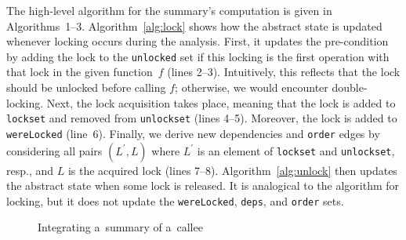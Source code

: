 \documentclass[runningheads]{llncs}
\begin{document}
The high-level algorithm for the summary's computation is given in
Algorithms~1--3.
%
Algorithm~\ref{alg:lock} shows how the abstract state is updated whenever
locking occurs during the analysis. First, it updates the pre-condition by
adding the lock to the \texttt{unlocked} set if this locking is the first
operation with that lock in the given function~$ f $ (lines 2--3). Intuitively,
this reflects that the lock should be unlocked before calling $f$; otherwise, we
would encounter double-locking. Next, the lock acquisition takes place, meaning
that the lock is added to \texttt{lockset} and removed from \texttt{unlockset}
(lines 4--5). Moreover, the lock is added to \texttt{wereLocked} (line~6).
Finally, we derive new dependencies and \texttt{order} edges by considering all
pairs $(L^\prime, L)$ where $L^\prime$ is an element of \texttt{lockset} and
\texttt{unlockset}, resp., and $L$ is the acquired lock (lines 7--8).
%
Algorithm~\ref{alg:unlock} then updates the abstract state when some lock is
released. It is analogical to the algorithm for locking, but it does not update
the \texttt{wereLocked}, \texttt{deps}, and \texttt{order} sets.

\begin{figure}[t]
\centering
\begin{algorithm}[H]
%
%
    \caption{Integrating a~summary of a~callee}
    \label{alg:sum}
\end{algorithm}
\vspace*{-6mm}
\end{figure}

\enlargethispage{4mm}
\end{document}
